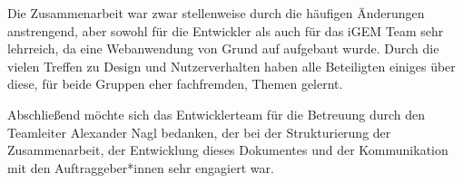 \documentclass[accentcolor=tud0b,12pt,paper=a4]{tudreport}
\begin{document}
	Die Zusammenarbeit war zwar stellenweise durch die häufigen Änderungen anstrengend, aber sowohl für die Entwickler als auch für das iGEM Team sehr lehrreich, da eine Webanwendung von Grund auf aufgebaut wurde. Durch die vielen Treffen zu Design und Nutzerverhalten haben alle Beteiligten einiges über diese, für beide Gruppen eher fachfremden, Themen gelernt.
	
	Abschließend möchte sich das Entwicklerteam für die Betreuung durch den Teamleiter Alexander Nagl bedanken, der bei der Strukturierung der Zusammenarbeit, der Entwicklung dieses Dokumentes und der Kommunikation mit den Auftraggeber*innen sehr engagiert war. 
\end{document}
